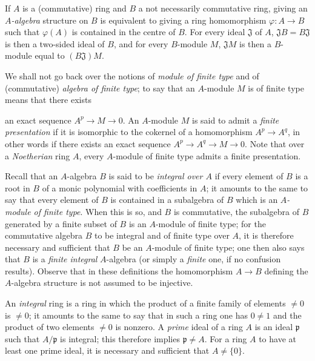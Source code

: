 \begin{env}[1.0.4]
\label{0.1.0.4}
If $A$ is a (commutative) ring and $B$ a not necessarily commutative ring, giving an \emph{$A$-algebra} structure on $B$ is equivalent to giving a ring homomorphism $\varphi:A\to B$ such that $\varphi(A)$ is contained in the centre of $B$.
For every ideal $\mathfrak{J}$ of $A$, $\mathfrak{J}B=B\mathfrak{J}$ is then a two-sided ideal of $B$, and for every $B$-module $M$, $\mathfrak{J}M$ is then a $B$-module equal to $(B\mathfrak{J})M$.
\end{env}

\begin{env}[1.0.5]
\label{0.1.0.5}
We shall not go back over the notions of \emph{module of finite type} and of (commutative) \emph{algebra of finite type}; to say that an $A$-module $M$ is of finite type means that there exists

an exact sequence $A^p\to M\to 0$.
An $A$-module $M$ is said to admit a \emph{finite presentation} if it is isomorphic to the cokernel of a homomorphism $A^p\to A^q$, in other words if there exists an exact sequence $A^p\to A^q\to M\to 0$.
Note that over a \emph{Noetherian} ring $A$, every $A$-module of finite type admits a finite presentation.

Recall that an $A$-algebra $B$ is said to be \emph{integral over $A$} if every element of $B$ is a root in $B$ of a monic polynomial with coefficients in $A$; it amounts to the same to say that every element of $B$ is contained in a subalgebra of $B$ which is an \emph{$A$-module of finite type}.
When this is so, and $B$ is commutative, the subalgebra of $B$ generated by a finite subset of $B$ is an $A$-module of finite type; for the commutative algebra $B$ to be integral and of finite type over $A$, it is therefore necessary and sufficient that $B$ be an $A$-module of finite type; one then also says that $B$ is a \emph{finite integral} $A$-algebra (or simply a \emph{finite} one, if no confusion results).
Observe that in these definitions the homomorphism $A\to B$ defining the $A$-algebra structure is not assumed to be injective.
\end{env}

\begin{env}[1.0.6]
\label{0.1.0.6}
An \emph{integral} ring is a ring in which the product of a finite family of elements $\neq 0$ is $\neq 0$; it amounts to the same to say that in such a ring one has $0\neq 1$ and the product of two elements $\neq 0$ is nonzero.
A \emph{prime} ideal of a ring $A$ is an ideal $\mathfrak{p}$ such that $A/\mathfrak{p}$ is integral; this therefore implies $\mathfrak{p}\neq A$.
For a ring $A$ to have at least one prime ideal, it is necessary and sufficient that $A\neq\{0\}$.
\end{env}

